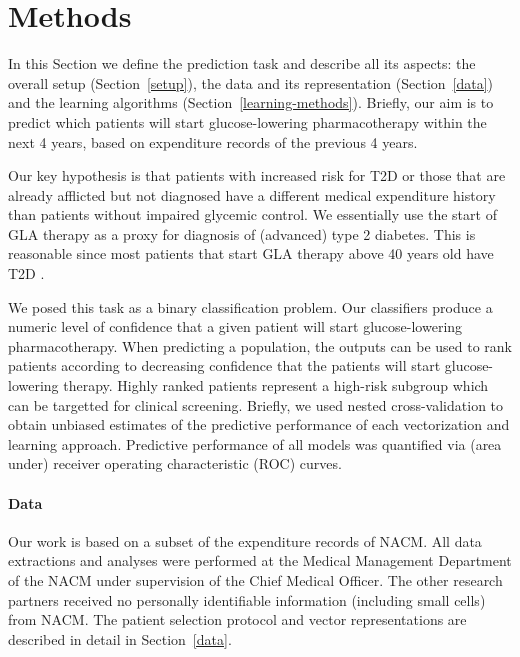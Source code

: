 %
%

\section{Methods}
In this Section we define the prediction task and describe all its aspects: the overall setup (Section~\ref{setup}), the data and its representation (Section~\ref{data}) and the learning algorithms (Section~\ref{learning-methods}). Briefly, our aim is to predict which patients will start glucose-lowering pharmacotherapy within the next 4 years, based on expenditure records of the previous 4 years. 

Our key hypothesis is that patients with increased risk for T2D or those that are already afflicted but not diagnosed have a different medical expenditure history than patients without impaired glycemic control. We essentially use the start of GLA therapy as a proxy for diagnosis of (advanced) type 2 diabetes. This is reasonable since most patients that start GLA therapy above 40 years old have T2D \citep{world1994prevention}.

We posed this task as a binary classification problem. Our classifiers produce a numeric level of confidence that a given patient will start glucose-lowering pharmacotherapy. When predicting a population, the outputs can be used to rank patients according to decreasing confidence that the patients will start glucose-lowering therapy. Highly ranked patients represent a high-risk subgroup which can be targetted for clinical screening. Briefly, we used nested cross-validation to obtain unbiased estimates of the predictive performance of each vectorization and learning approach. Predictive performance of all models was quantified via (area under) receiver operating characteristic (ROC) curves. 

\paragraph{Data} Our work is based on a subset of the expenditure records of NACM. All data extractions and analyses were performed at the Medical Management Department of the NACM under supervision of the Chief Medical Officer. The other research partners received no personally identifiable information (including small cells) from NACM. The patient selection protocol and vector representations are described in detail in Section~\ref{data}.


